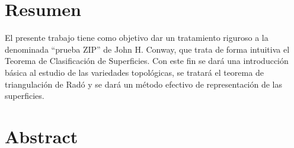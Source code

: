 \documentclass[10pt]{report}
\theoremstyle{definition}
\begin{document}

\section*{Resumen}
El presente trabajo tiene como objetivo dar un tratamiento riguroso a la denominada ``prueba ZIP'' de John H. Conway, que trata de forma intuitiva el Teorema de Clasificación de Superficies. Con este fin se dará una introducción básica al estudio de las variedades topológicas, se tratará el teorema de triangulación de Radó y se dará un método efectivo de representación de las superficies. 

\section*{Abstract}
\clearpage
\end{document}
